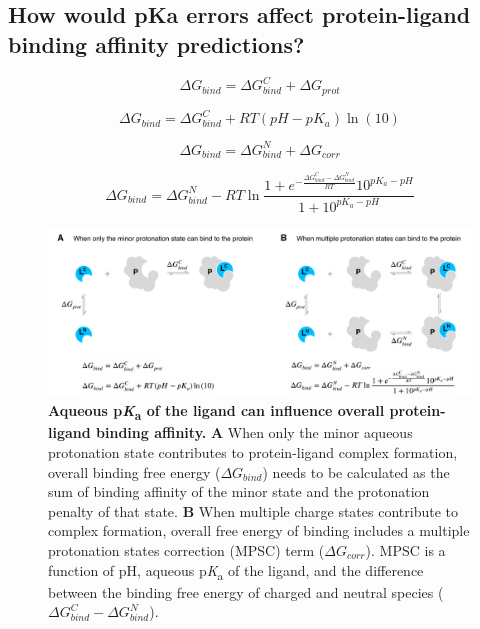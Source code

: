 \documentclass[9pt,lineno,final]{elife}
\newcommand{\pKa}{p\textit{K}\textsubscript{a}}
\begin{document}
\subsection{How would pKa errors affect protein-ligand binding affinity predictions?}



$$ \Delta G_{bind} =\Delta G_{bind}^{C} + \Delta G_{prot}$$  

$$ \Delta G_{bind} =\Delta G_{bind}^{C} + RT(pH - pK_a) \ln{(10)}$$

$$ \Delta G_{bind} =\Delta G_{bind}^{N} + \Delta G_{corr}$$  

$$ \Delta G_{bind} =\Delta G_{bind}^{N} - RT\ln{\frac{1 + e^{-\frac{\Delta G_{bind}^{C} - \Delta G_{bind}^{N}}{RT}}10^{pK_a - pH}}{1 + 10^{pK_a - pH}}} $$  


\begin{figure}
\centering
\includegraphics[width=1.0\linewidth]{figures/pKa-effects-on-protein-ligand-binding.pdf}
\caption{ {\bf Aqueous \pKa{} of the ligand can influence overall protein-ligand binding affinity.} {\bf A} When only the minor aqueous protonation state contributes to protein-ligand complex formation, overall binding free energy ($\Delta G_{bind}$) needs to be calculated as the sum of binding affinity of the minor state and the protonation penalty of that state. {\bf B} When multiple charge states contribute to complex formation, overall free energy of binding includes a multiple protonation states correction (MPSC) term ($\Delta G_{corr}$). MPSC is a function of pH, aqueous \pKa{} of the ligand, and the difference between the binding free energy of charged and neutral species ($\Delta G_{bind}^{C} - \Delta G_{bind}^{N}$).
}
\label{fig:pKa-effects-on-protein-ligand-binding}
\end{figure}
\end{document}
